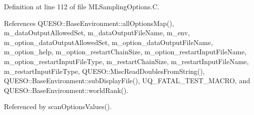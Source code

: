 Definition at line 112 of file M\-L\-Sampling\-Options.\-C.



References Q\-U\-E\-S\-O\-::\-Base\-Environment\-::all\-Options\-Map(), m\-\_\-data\-Output\-Allowed\-Set, m\-\_\-data\-Output\-File\-Name, m\-\_\-env, m\-\_\-option\-\_\-data\-Output\-Allowed\-Set, m\-\_\-option\-\_\-data\-Output\-File\-Name, m\-\_\-option\-\_\-help, m\-\_\-option\-\_\-restart\-Chain\-Size, m\-\_\-option\-\_\-restart\-Input\-File\-Name, m\-\_\-option\-\_\-restart\-Input\-File\-Type, m\-\_\-restart\-Chain\-Size, m\-\_\-restart\-Input\-File\-Name, m\-\_\-restart\-Input\-File\-Type, Q\-U\-E\-S\-O\-::\-Misc\-Read\-Doubles\-From\-String(), Q\-U\-E\-S\-O\-::\-Base\-Environment\-::sub\-Display\-File(), U\-Q\-\_\-\-F\-A\-T\-A\-L\-\_\-\-T\-E\-S\-T\-\_\-\-M\-A\-C\-R\-O, and Q\-U\-E\-S\-O\-::\-Base\-Environment\-::world\-Rank().



Referenced by scan\-Options\-Values().


